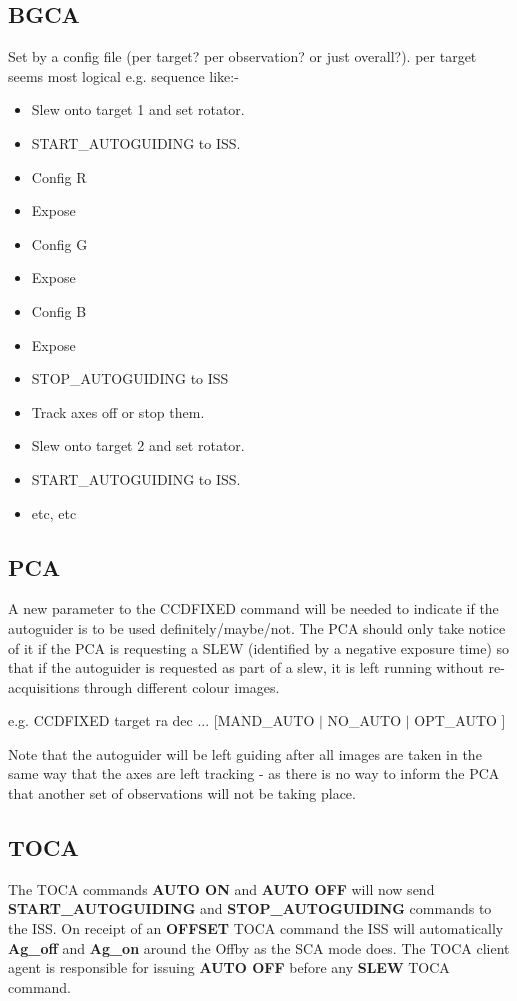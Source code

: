 \documentclass{article}
\begin{document}
\subsection{BGCA}

Set by a config file (per target?  per observation? or just
overall?). per target seems most logical e.g. sequence like:-

\begin{itemize}
\item Slew onto target 1 and set rotator.
\item START\_AUTOGUIDING to ISS.
\item Config R
\item Expose
\item Config G
\item Expose
\item Config B
\item Expose
\item STOP\_AUTOGUIDING to ISS
\item Track axes off or stop them.
\item Slew onto target 2 and set rotator.
\item START\_AUTOGUIDING to ISS.
\item etc, etc
\end{itemize}


\subsection{PCA}

A new parameter to the CCDFIXED command will be needed
to indicate if the autoguider is to be used definitely/maybe/not.
The PCA should only take notice of it if the PCA is
requesting a SLEW (identified by a negative exposure time)
so that if the autoguider is requested as part of a slew,
it is left running without re-acquisitions through
different colour images.

e.g. CCDFIXED target ra dec ... [MAND\_AUTO $|$ NO\_AUTO $|$ OPT\_AUTO ] 

Note that the autoguider will be left guiding after all images are taken in the same way
that the axes are left tracking - as there is no way to inform the PCA that another set
of observations will not be taking place. 

\subsection{TOCA}

The TOCA commands {\bf AUTO ON} and {\bf AUTO OFF} will now send
{\bf START\_AUTOGUIDING} and {\bf STOP\_AUTOGUIDING} commands to the ISS.
On receipt of an {\bf OFFSET} TOCA command the ISS will automatically {\bf Ag\_off} and 
{\bf Ag\_on} around the Offby as the SCA mode does. 
The TOCA client agent is responsible for issuing {\bf AUTO OFF} before any {\bf SLEW} TOCA command.
\end{document}
